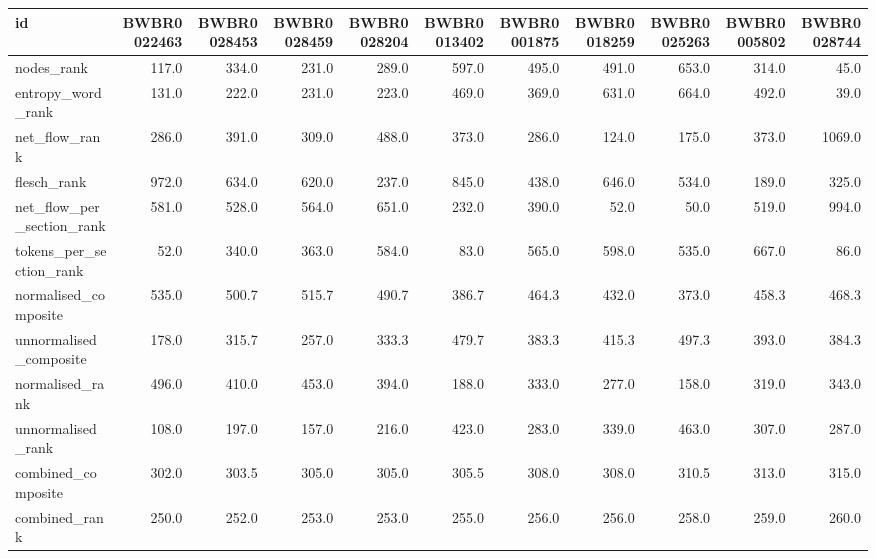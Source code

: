 \begin{tabular}{lrrrrrrrrrr}
\toprule
id & BWBR0022463 & BWBR0028453 & BWBR0028459 & BWBR0028204 & BWBR0013402 & BWBR0001875 & BWBR0018259 & BWBR0025263 & BWBR0005802 & BWBR0028744 \\
\midrule
nodes\_rank & 117.0 & 334.0 & 231.0 & 289.0 & 597.0 & 495.0 & 491.0 & 653.0 & 314.0 & 45.0 \\
\cline{1-11}
entropy\_word\_rank & 131.0 & 222.0 & 231.0 & 223.0 & 469.0 & 369.0 & 631.0 & 664.0 & 492.0 & 39.0 \\
\cline{1-11}
net\_flow\_rank & 286.0 & 391.0 & 309.0 & 488.0 & 373.0 & 286.0 & 124.0 & 175.0 & 373.0 & 1069.0 \\
\cline{1-11}
flesch\_rank & 972.0 & 634.0 & 620.0 & 237.0 & 845.0 & 438.0 & 646.0 & 534.0 & 189.0 & 325.0 \\
\cline{1-11}
net\_flow\_per\_section\_rank & 581.0 & 528.0 & 564.0 & 651.0 & 232.0 & 390.0 & 52.0 & 50.0 & 519.0 & 994.0 \\
\cline{1-11}
tokens\_per\_section\_rank & 52.0 & 340.0 & 363.0 & 584.0 & 83.0 & 565.0 & 598.0 & 535.0 & 667.0 & 86.0 \\
\cline{1-11}
normalised\_composite & 535.0 & 500.7 & 515.7 & 490.7 & 386.7 & 464.3 & 432.0 & 373.0 & 458.3 & 468.3 \\
\cline{1-11}
unnormalised\_composite & 178.0 & 315.7 & 257.0 & 333.3 & 479.7 & 383.3 & 415.3 & 497.3 & 393.0 & 384.3 \\
\cline{1-11}
normalised\_rank & 496.0 & 410.0 & 453.0 & 394.0 & 188.0 & 333.0 & 277.0 & 158.0 & 319.0 & 343.0 \\
\cline{1-11}
unnormalised\_rank & 108.0 & 197.0 & 157.0 & 216.0 & 423.0 & 283.0 & 339.0 & 463.0 & 307.0 & 287.0 \\
\cline{1-11}
combined\_composite & 302.0 & 303.5 & 305.0 & 305.0 & 305.5 & 308.0 & 308.0 & 310.5 & 313.0 & 315.0 \\
\cline{1-11}
combined\_rank & 250.0 & 252.0 & 253.0 & 253.0 & 255.0 & 256.0 & 256.0 & 258.0 & 259.0 & 260.0 \\
\cline{1-11}
\bottomrule
\end{tabular}
